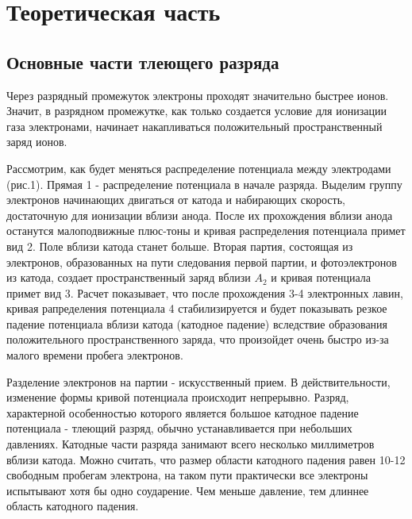 



\def\labauthors{Карусевич А.А., Разова А.А.}
\def\labgroup{440}
\def\labnumber{3}
\def\labtheme{Исследование биполярных процессов переноса тока в тлеющем разряде}
\renewcommand{\vec}{\mathbf}
\renewcommand{\phi}{\varphi}
\renewcommand{\hat}{\widehat}



\section{Теоретическая часть}
\subsection{Основные части тлеющего разряда}
Через разрядный промежуток электроны проходят значительно быстрее ионов. Значит, в разрядном промежутке, как только
 создается условие для ионизации газа электронами, начинает накапливаться положительный пространственный заряд 
 ионов.

Рассмотрим, как будет меняться распределение потенциала между электродами (рис.1). Прямая 1 - распределение
 потенциала в начале разряда. Выделим группу электронов начинающих двигаться от катода и набирающих скорость,
 достаточную для ионизации вблизи анода. После их прохождения вблизи анода останутся малоподвижные плюс-тоны и
  кривая распределения потенциала примет вид 2. Поле вблизи катода станет больше. Вторая партия, состоящая из 
  электронов, образованных на пути следования первой партии, и фотоэлектронов из катода, создает пространственный 
  заряд вблизи $A_2$ и кривая потенциала примет вид 3. Расчет показывает, что после прохождения 3-4 электронных 
  лавин, кривая рапределения потенциала 4 стабилизируется и будет показывать резкое падение потенциала вблизи 
  катода (катодное падение) вследствие образования положительного пространственного заряда, что произойдет очень 
  быстро из-за малого времени пробега электронов.

  Разделение электронов на партии - искусственный прием. В действительности, изменение формы кривой потенциала 
  происходит непрерывно. Разряд, характерной особенностью которого является большое катодное падение потенциала -
   тлеющий разряд, обычно устанавливается при небольших давлениях. Катодные части разряда занимают всего несколько 
   миллиметров вблизи катода. Можно считать, что размер области катодного падения равен 10-12 свободным пробегам 
   электрона, на таком пути практически все электроны испытывают хотя бы одно соударение. Чем меньше давление, тем 
   длиннее область катодного падения.

